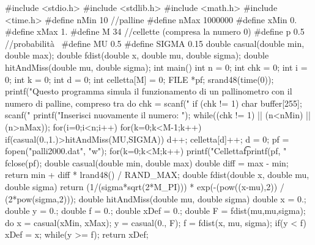 \documentclass[10pt,oneside,a4paper]{article}
\begin{document}
\begin{codice_c}[caption={Simulazione di un pallinometro con distribuzione gaussiana della probabilità  di cadere a destra per ogni chiodo}, label={list:codice}][H]
#include <stdio.h>
#include <stdlib.h>
#include <math.h>
#include <time.h>
#define nMin 10 //palline
#define nMax 1000000
#define xMin 0.
#define xMax 1.
#define M 34 //cellette (compresa la numero 0)
#define p 0.5 //probabilità 
#define MU 0.5
#define SIGMA 0.15
double casual(double min, double max);
double fdist(double x, double mu, double sigma);
double hitAndMiss(double mu, double sigma);
int main() {
  int n = 0;
  int chk = 0;
  int i = 0;
  int k = 0;
  int d = 0;
  int celletta[M] = {0};
  FILE *pf;
  srand48(time(0));
  printf("Questo programma simula il funzionamento di un
pallinometro con %
il numero di palline, compreso tra %
  do {
  chk = scanf("%
  if (chk != 1) {
    char buffer[255];
    scanf("%
    printf("Inserisci nuovamente il numero: ");
  }
  } while((chk != 1) || (n<nMin) || (n>nMax));
  for(i=0;i<n;i++) {
    for(k=0;k<M-1;k++) {
      if(casual(0.,1.)>hitAndMiss(MU,SIGMA)) {
        d++;
} }
    celletta[d]++;
d = 0; }
  pf = fopen("palli2000.dat", "w");
for(k=0;k<M;k++) {
    printf("Celletta\t%
    fprintf(pf, "%
}
  fclose(pf);
}
double casual(double min, double max) {
  double diff = max - min;
  return min + diff * lrand48() / RAND_MAX;
}
double fdist(double x, double mu, double sigma) {
  return (1/(sigma*sqrt(2*M_PI))) * exp(-(pow((x-mu),2)) /
(2*pow(sigma,2)));
}
double hitAndMiss(double mu, double sigma) {
  double x = 0.;
  double y = 0.;
  double f = 0.;
  double xDef = 0.;
  double F = fdist(mu,mu,sigma);
  do {
    x = casual(xMin, xMax);
    y = casual(0., F);
    f = fdist(x, mu, sigma);
    if(y < f) {
      xDef = x;
    }
  } while(y >= f);
  return xDef;
}
\end{codice_c}
\end{document}
